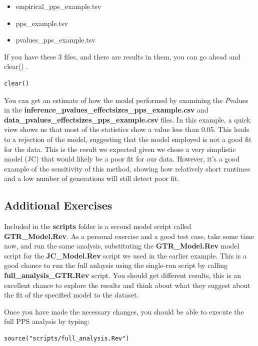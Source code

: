 \begin{equation *}
\begin{equation *}
\begin{equation *}
\begin{itemize}
\item empirical\_pps\_example.tsv
\item pps\_example.tsv
\item pvalues\_pps\_example.tsv
\end{itemize}

If you have these 3 files, and there are results in them, you can go ahead and clear() \RevBayes.

{\tt \begin{Snugshade}[184,207,236]
\begin{lstlisting}  
clear()
\end{lstlisting}
\end{Snugshade}}

You can get an estimate of how the model performed by examining the \textit{P}\-values in the 
\textbf{inference\_pvalues\_effectsizes\_pps\_example.csv} and \textbf{data\_pvalues\_effectsizes\_pps\_example.csv} files. In this example, a quick view shows us that most of the statistics show a value less than 0.05. This leads to a rejection of the model, suggesting 
that the model employed is not a good fit for the data. This is the result we expected given we chose a very 
simplistic model (JC) that would likely be a poor fit for our data. However, it's a good example 
of the sensitivity of this method, showing how relatively short runtimes and a low number of generations will 
still detect poor fit. 


\subsection{Additional Exercises}

Included in the \textbf{scripts} folder is a second model script called \textbf{GTR\_Model.Rev}. 
As a personal exercise and a good test case, take some time now, and run the same analysis, substituting
the \textbf{GTR\_Model.Rev} model script for the \textbf{JC\_Model.Rev} script we used in the earlier example.
This is a good chance to run the full anlaysis using the single-run script by calling \textbf{full\_analysis\_GTR.Rev} script.  
You should get different results, this is an excellent chance to explore the results and think about what
they suggest about the fit of the specified model to the dataset. 

Once you have made the necessary changes, you should be able to execute the full PPS analysis by typing:

{\tt \begin{Snugshade}[184,207,236]
\begin{lstlisting}  
source("scripts/full_analysis.Rev")
\end{lstlisting}
\end{Snugshade}}


\end{equation *}
\end{equation *}
\end{equation *}
